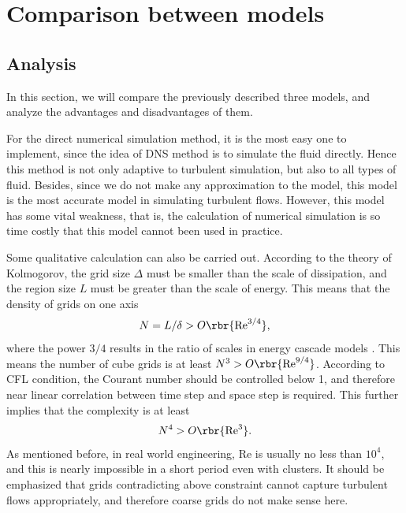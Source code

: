 \documentclass[english, nochinese]{pkupaper}
\begin{document}
\section{Comparison between models} \label{Sec:Comp}

\subsection{Analysis}

In this section, we will compare the previously described three models, and analyze the advantages and disadvantages of them. 

For the direct numerical simulation method, it is the most easy one to implement, since the idea of DNS method is to simulate the fluid directly. Hence this method is not only adaptive to turbulent simulation, but also to all types of fluid. Besides, since we do not make any approximation to the model, this model is the most accurate model in simulating turbulent flows. However, this model has some vital weakness, that is, the calculation of numerical simulation is so time costly that this model cannot been used in practice.

Some qualitative calculation can also be carried out. According to the theory of Kolmogorov, the grid size $\Delta$ must be smaller than the scale of dissipation, and the region size $L$ must be greater than the scale of energy. This means that the density of grids on one axis
\begin{equation}
N = L / \delta > O \rbr{ \mathrm{Re}^{ 3 / 4 } } ,
\end{equation}
where the power $ 3 / 4 $ results in the ratio of scales in energy cascade models \parencite{pope_turbulent_2001}. This means the number of cube grids is at least $ N^3 > O \rbr{ \mathrm{Re}^{ 9 / 4 } } $. According to CFL condition, the Courant number should be controlled below 1, and therefore near linear correlation between time step and space step is required. This further implies that the complexity is at least
\begin{equation}
N^4 > O \rbr{ \mathrm{Re}^3 }.
\end{equation}
As mentioned before, in real world engineering, $\mathrm{Re}$ is usually no less than $10^4$, and this is nearly impossible in a short period even with clusters. It should be emphasized that grids contradicting above constraint cannot capture turbulent flows appropriately, and therefore coarse grids do not make sense here.
\end{document}
